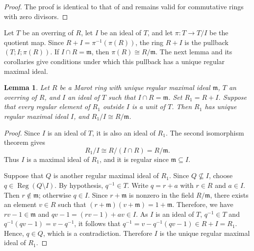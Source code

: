 \documentclass[12pt]{article}
\newtheorem{lemma}{Lemma}
\newcommand{\Reg}{\operatorname{Reg}}
\begin{document}
	\begin{proof}
		The proof is identical to that of \cite[Lemma 4]{ayache} and remains valid for commutative rings with zero divisors.
	\end{proof}
	Let $T$ be an overring of $R$, let $I$ be an ideal of $T$, and let $\pi:T\longrightarrow T/I$ be the quotient map. Since $R+I=\pi^{-1}(\pi(R))$, the ring $R+I$ is the pullback $(T;I;\pi(R))$. If $I\cap R=\mathfrak m$, then $\pi(R)\cong R/\mathfrak m$. The next lemma and its corollaries give conditions under which this pullback has a unique regular maximal ideal.
	\begin{lemma}\label{unit-pullback}
		Let $R$ be a Marot ring with unique regular maximal ideal $\mathfrak{m}$, $T$ an overring of $R$, and $I$ an ideal of $T$ such that $I\cap R=\mathfrak{m}$. Set $R_1=R+I$. Suppose that every regular element of $R_1$ outside $I$ is a unit of $T$. Then $R_1$ has unique regular maximal ideal $I$, and $R_1/I\cong R/\mathfrak{m}$.
	\end{lemma}
	\begin{proof}
		Since $I$ is an ideal of $T$, it is also an ideal of $R_1$. The second isomorphism theorem gives
		\[
		R_1/I\cong R/(I\cap R)=R/\mathfrak{m}.
		\]
		Thus $I$ is a maximal ideal of $R_1$, and it is regular since $\mathfrak{m}\subseteq I$.
		
		Suppose that $Q$ is another regular maximal ideal of $R_1$. Since $Q\nsubseteq I$, choose $q\in\Reg(Q\setminus I)$. By hypothesis, $q^{-1}\in T$. Write $q=r+a$ with $r\in R$ and $a\in I$. Then $r\notin\mathfrak{m}$; otherwise $q\in I$. Since $r+\mathfrak{m}$ is nonzero in the field $R/\mathfrak{m}$, there exists an element $v\in R$ such that $(r+\mathfrak{m})(v+\mathfrak{m})=1+\mathfrak{m}$. Therefore, we have $rv-1\in\mathfrak{m}$ and $qv-1=(rv-1)+av\in I$. As $I$ is an ideal of $T$, $q^{-1}\in T$ and $q^{-1}(qv-1)=v-q^{-1}$, it follows that $q^{-1}=v-q^{-1}(qv-1)\in R+I=R_1$. Hence, $q\in Q$, which is a contradiction. Therefore $I$ is the unique regular maximal ideal of $R_1$.
	\end{proof}
\end{document}
